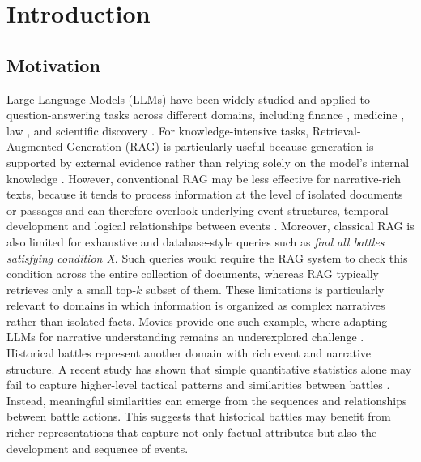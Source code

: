 \chapter{Introduction}
\label{chap:introduction}

\section{Motivation}
\label{sec:motivation}
Large Language Models (LLMs) have been widely studied and applied to question-answering tasks across different domains, including finance \citep{sarmah2024hybridrag}, medicine \citep{wang2024llmhealthcare}, law \citep{lai2024llmlaw}, and scientific discovery \citep{zhang2024scientificllm}. For knowledge-intensive tasks, Retrieval-Augmented Generation (RAG) is particularly useful because generation is supported by external evidence rather than relying solely on the model's internal knowledge \citep{lewis2020rag}. However, conventional RAG may be less effective for narrative-rich texts, because it tends to process information at the level of isolated documents or passages and can therefore overlook underlying event structures, temporal development and logical relationships between events \citep{yang2025eventrag}. Moreover, classical RAG is also limited for exhaustive and database-style queries such as \textit{find all battles satisfying condition X}. Such queries would require the RAG system to check this condition across the entire collection of documents, whereas RAG typically retrieves only a small top-$k$ subset of them. These limitations is particularly relevant to domains in which information is organized as complex narratives rather than isolated facts. Movies provide one such example, where adapting LLMs for narrative understanding remains an underexplored challenge \citep{shen2025narrative}. Historical battles represent another domain with rich event and narrative structure. A recent study has shown that simple quantitative statistics alone may fail to capture higher-level tactical patterns and similarities between battles \citep{coulson2023actionclusters}. Instead, meaningful similarities can emerge from the sequences and relationships between battle actions. This suggests that historical battles may benefit from richer representations that capture not only factual attributes but also the development and sequence of events.

